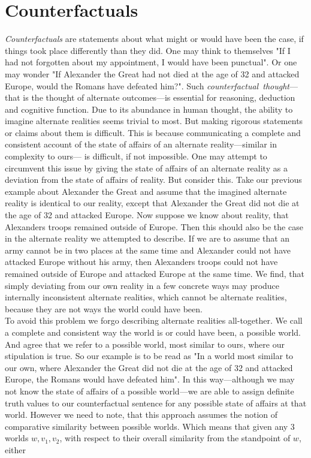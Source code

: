 \documentclass[a4paper,american,10pt]{paper}
\theoremstyle{definition}\newtheorem{definition}{Definition}
\begin{document}
\section{Counterfactuals}
\textit{Counterfactuals} are statements about what might or would have been the case, if things took place differently than they did. One may think to themselves "If I had not forgotten about my appointment, I would have been punctual". Or one may wonder "If Alexander the Great had not died at the age of 32 and attacked Europe, would the Romans have defeated him?". Such \textit{counterfactual~thought}---that is the thought of alternate outcomes---is essential for reasoning, deduction and cognitive function. \cite{byrne_counterfactual_2016} Due to its abundance in human thought, the ability to imagine alternate realities seems trivial to most. But making rigorous statements or claims about them is difficult. This is because communicating a complete and consistent account of the state of affairs of an alternate reality---similar in complexity to ours--- is difficult, if not impossible. One may attempt to circumvent this issue by giving the state of affairs of an alternate reality as a deviation from the state of affairs of reality. But consider this. 
Take our previous example about Alexander the Great and assume that the imagined alternate reality is identical to our reality, except that Alexander the Great did not die at the age of 32 and attacked Europe. Now suppose we know about reality, that Alexanders troops remained outside of Europe. Then this should also be the case in the alternate reality we attempted to describe. If we are to assume that an army cannot be in two places at the same time and Alexander could not have attacked Europe without his army, then Alexanders troops could not have remained outside of Europe and attacked Europe at the same time.
We find, that simply deviating from our own reality in a few concrete ways may produce internally inconsistent alternate realities, which cannot be alternate realities, because they are not ways the world could have been.\\
To avoid this problem we forgo describing alternate realities all-together. We call a complete and consistent way the world is or could have been, a possible world. And agree that we refer to a possible world, most similar to ours, where our stipulation is true. So our example is to be read as "In a world most similar to our own, where Alexander the Great did not die at the age of 32 and attacked Europe, the Romans would have defeated him". In this way---although we may not know the state of affairs of a possible world---we are able to assign definite truth values to our counterfactual sentence for any possible state of affairs at that world. However we need to note, that this approach assumes the notion of comparative similarity between possible worlds. Which means that given any 3 worlds $w,v_1,v_2$, with respect to their overall similarity from the standpoint of $w$, either
\end{document}
